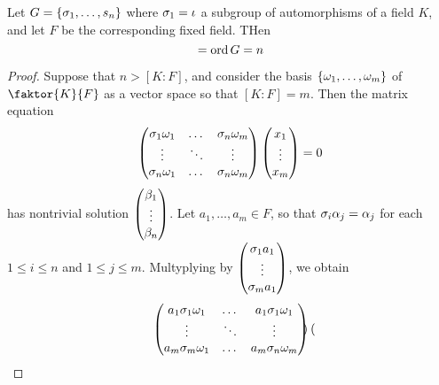 \begin{theorem}\label{2.2.2}
    Let $G=\{\sigma_1, \dots, s_n\}$ where $\sigma_1=\iota$ a subgroup of automorphisms of
    a field $K$, and let  $F$ be the corresponding fixed field. THen
    \begin{equation*}
        [K:F]=\ord{G}=n
    \end{equation*}
\end{theorem}
\begin{proof}
    Suppose that $n>[K:F]$, and consider the basis $\{\omega_1, \dots, \omega_m\}$ of
    $\faktor{K}{F}$ as a vector space so that $[K:F]=m$. Then the matrix
    equation
    \begin{equation}
        \begin{pmatrix}
            \sigma_1\omega_1    &   \dots   &   \sigma_n\omega_m    \\
            \vdots      &   \ddots  &   \vdots  \\
            \sigma_n\omega_1    &   \dots   &   \sigma_n\omega_m    \\
        \end{pmatrix}
        \begin{pmatrix}
            x_1 \\  \vdots  \\  x_m \\
        \end{pmatrix}
        =0
    \end{equation}
    has nontrivial solution $\begin{pmatrix} \beta_1 \\ \vdots \\ \beta_n
    \end{pmatrix}$. Let $a_1, \dots, a_m \in F$, so that $\sigma_i\alpha_j=\alpha_j$ for
    each  $1 \leq i \leq n$ and $1 \leq j \leq m$. Multyplying by
    $\begin{pmatrix} \sigma_1a_1 \\ \vdots \\ \sigma_ma_1 \end{pmatrix}$, we obtain
    \begin{equation*}
        \begin{pmatrix}
            a_1\sigma_1\omega_1    &   \dots   &   a_1\sigma_1\omega_1    \\
            \vdots      &   \ddots  &   \vdots  \\
            a_m\sigma_m\omega_1    &   \dots   &   a_m\sigma_n\omega_m    \\
        \end{pmatrix}
        \begin{pmatrix}

\end{pmatrix}
\end{equation*}
\end{proof}
